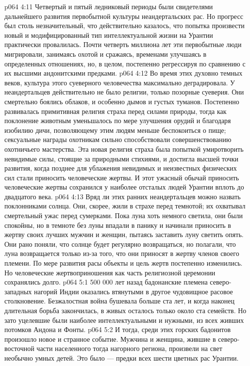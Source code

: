 \vs p064 4:11 Четвертый и пятый ледниковый периоды были свидетелями дальнейшего развития первобытной культуры неандертальских рас. Но прогресс был столь незначительный, что действительно казалось, что попытка произвести новый и модифицированный тип интеллектуальной жизни на Урантии практически провалилась. Почти четверть миллиона лет эти первобытные люди мигрировали, занимаясь охотой и сражаясь, временами улучшаясь в определенных отношениях, но, в целом, постепенно регрессируя по сравнению с их высшими андонитскими предками.
\vs p064 4:12 \pc Во время этих духовно темных веков, культура этого суеверного человечества максимально деградировала. У неандертальцев действительно не было религии, только позорные суеверия. Они смертельно боялись облаков, и особенно дымов и густых туманов. Постепенно развивалась примитивная религия страха перед силами природы, тогда как поклонение животным уменьшалось по мере улучшения орудий и благодаря изобилию дичи, позволяющему этим людям меньше беспокоиться о пище; сексуальные награды охотникам сильно способствовали совершенствованию охотничьего мастерства. Эта новая религия страха была попыткой умиротворить невидимые силы, стоящие за природными стихиями, и достигла высшей точки развития, когда позднее для ублажения невидимых и неизвестных физических сил стали приносить человеческие жертвы. И этот ужасный обычай приносить человеческие жертвы сохранился у наиболее отсталых людей Урантии вплоть до двадцатого века.
\vs p064 4:13 Вряд ли этих ранних неандертальцев можно назвать поклонниками солнца. Они, скорее, жили в страхе перед темнотой; их охватывал смертельный ужас перед сумерками. Пока луна хоть немного светила, они были спокойны, но в темноте без луны впадали в панику и начинали приносить в жертву своих лучших мужчин и женщин, пытаясь заставить луну светить опять. Они рано поняли, что солнце будет регулярно возвращаться, но полагали, что луна возвращается только из\hyp{}за того, что они приносят в жертву членов своего племени. По мере развития расы объекты и цель жертв постепенно изменились. Но человеческие жертвоприношения как часть религиозной церемонии сохранялись долго.
\vs p064 5:1 500 000 лет назад бадонанские племена северо\hyp{}западных нагорий Индии оказались втянутыми в другое чудовищное расовое столкновение. Безжалостная война бушевала больше ста лет, и когда наконец длительная борьба закончилась, в живых осталось только около ста семейств. Но зато уцелевшие были наиболее интеллектуальными и нужными, из всех живших потомков Андона и Фонты.
\vs p064 5:2 И тогда, среди этих горских бадонитов произошло новое и странное событие. Мужчина и женщина, жившие в северо\hyp{}восточной части населенного тогда нагорного региона,  произвели на свет необычно умных детей. Это было  --- предки всех шести цветных рас Урантии.
